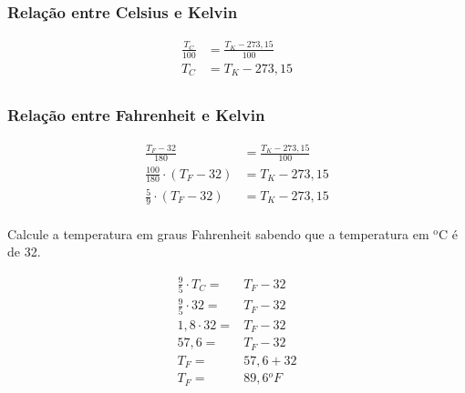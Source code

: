 \subsubsection{Relação entre Celsius e Kelvin}
\begin{ceqn}
    \begin{align*}
        \frac{T_C}{100} &= \frac{T_K-273,15}{100} \\
        T_C&=T_K-273,15 \\
    \end{align*}
\end{ceqn}

\subsubsection{Relação entre Fahrenheit e Kelvin}
\begin{ceqn}
    \begin{align*}
        \frac{T_F - 32}{180} &= \frac{T_K-273,15}{100} \\
        \frac{100}{180}\cdot (T_F-32) &= T_K-273,15 \\
        \frac{5}{9} \cdot (T_F-32) &= T_K-273,15 \\
    \end{align*}
\end{ceqn}



\begin{example}
Calcule a temperatura em graus Fahrenheit sabendo que a temperatura em ${}^\text{o}$C é de 32.

\begin{ceqn}
\begin{align*}
\frac{9}{5} \cdot T_C =& T_F - 32 \\
\frac{9}{5} \cdot 32 =& T_F - 32 \\
1,8 \cdot 32 =& T_F - 32 \\
57,6 =& T_F -32 \\
T_F =& 57,6 + 32 \\
T_F =& 89,6 {}^oF \\
\end{align*}
\end{ceqn}
\end{example}

